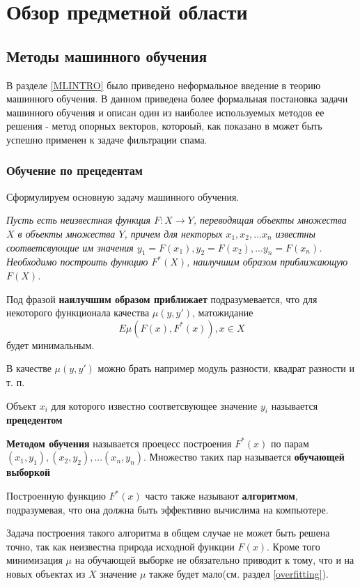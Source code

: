 \newpage
\section{Обзор предметной области}
\label{review}

\subsection{Методы машинного обучения} 
\label{ML}
В разделе \ref{MLINTRO} было приведено неформальное введение в теорию машинного обучения. В данном приведена более формальная постановка задачи машинного обучения и описан один из наиболее используемых методов ее решения - метод опорных векторов, котороый, как показано в \cite{ROZ}  может быть успешно применен к задаче фильтрации спама. 
\subsubsection{Обучение по прецедентам}
Сформулируем основную задачу машинного обучения.

\textit{
Пусть есть неизвестная функция $F: X \rightarrow Y$, переводящая объекты
множества $X$ в объекты множества $Y$, причем для некторых $x_1, x_2, ... x_n$ известны соответсвующие им значения $y_1 = F(x_1), y_2 = F(x_2), ... y_n = F(x_n)$.
Необходимо построить функцию $F^*(X)$, наилучшим образом приближающую $F(X)$.
}

Под фразой \textbf{наилучшим образом приближает} подразумевается, что для некоторого функционала качества $\mu(y, y')$, матожидание
\begin{equation}
\label{matozh}
E\mu(F(x), F^*(x)), x \in X
\end{equation}
будет минимальным.

В качестве $\mu(y, y')$ можно брать например модуль разности, квадрат разности и т. п.

Объект $x_i$ для которого известно соответсвующее значение $y_i$ называется \textbf{прецедентом}

\textbf{Методом обучения} называется проецесс построения $F^*(x)$ по парам $(x_1, y_1), (x_2, y_2), ... (x_n, y_n)$. Множество таких пар называется \textbf{обучающей выборкой}

Построенную функцию $F^*(x)$ часто также называют \textbf{алгоритмом}, подразумевая,  что она должна быть эффективно вычислима на компьютере.

Задача построения такого алгоритма в общем случае не может быть решена точно, так как неизвестна природа исходной функции $F(x)$. Кроме того минимизация $\mu$ на обучающей выборке не обязательно приводит к тому, что и на новых объектах из $X$ значение $\mu$ также будет мало(см. раздел \ref{overfitting}).

